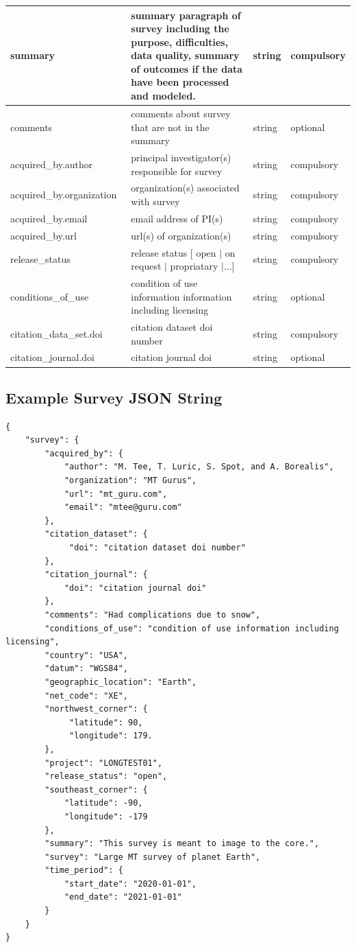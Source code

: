 \documentclass{article}
\begin{document}
\begin{table}[htb!]
\begin{tabular}{|l|p{3.65in}|l|l|}
		summary\ & summary paragraph of survey including the purpose, difficulties, data quality, summary of outcomes if the data have been processed and modeled. & string & compulsory \\ \hline
		comments\ & comments about survey that are not in the summary & string & optional \\ \hline
		acquired\_by.author\ & principal investigator(s) responsible for survey & string & compulsory \\ \hline
		acquired\_by.organization\ & organization(s) associated with survey & string & compulsory \\ \hline
		acquired\_by.email\ & email address of PI(s) & string & compulsory \\ \hline
		acquired\_by.url\ & url(s) of organization(s) & string & compulsory \\ \hline
		release\_status\ & release status [ open $|$ on request $|$ propriatary $|$...] & string & compulsory \\ \hline
		conditions\_of\_use\ & condition of use information information including licensing & string & optional \\ \hline
		citation\_data\_set.doi & citation dataset doi number & string & compulsory \\ \hline
		citation\_journal.doi & citation journal doi & string & optional \\ \hline
	\end{tabular}
	\label{tab:survey}
\end{table} 

\newpage
\subsection{Example Survey JSON String}

\begin{verbatim}
{
    "survey": {
        "acquired_by": {
            "author": "M. Tee, T. Luric, S. Spot, and A. Borealis",
            "organization": "MT Gurus",
            "url": "mt_guru.com",
            "email": "mtee@guru.com"
        },
        "citation_dataset": {
             "doi": "citation dataset doi number"
        },
        "citation_journal": {
            "doi": "citation journal doi"
        },
        "comments": "Had complications due to snow",
        "conditions_of_use": "condition of use information including licensing",
        "country": "USA",
        "datum": "WGS84",
        "geographic_location": "Earth",
        "net_code": "XE",
        "northwest_corner": {
             "latitude": 90,
             "longitude": 179.
        },
        "project": "LONGTEST01",
        "release_status": "open",
        "southeast_corner": {
            "latitude": -90,
            "longitude": -179
        },
        "summary": "This survey is meant to image to the core.",
        "survey": "Large MT survey of planet Earth",
        "time_period": {
            "start_date": "2020-01-01",
            "end_date": "2021-01-01"
        }
    }
}
\end{verbatim}
\end{document}
